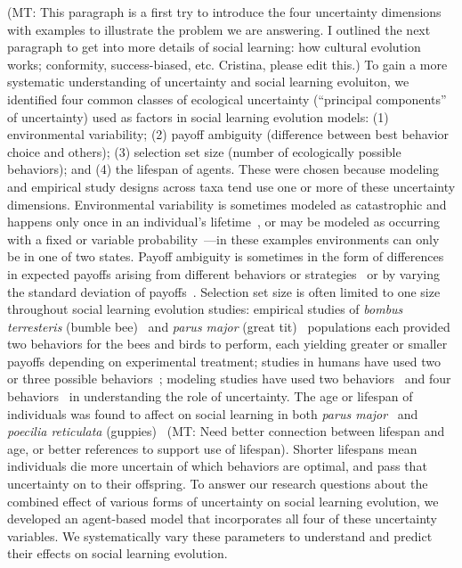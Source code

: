 \documentclass[letterpaper,11.5pt]{scrartcl}
\newcommand{\mt}[1]{{\textcolor{myorange} {({\tiny MT:} #1)}}}
\begin{document}
\mt{This paragraph is a first try to introduce the four uncertainty dimensions
with examples to illustrate the problem we are answering.
I outlined the next paragraph to get into more details of social learning:
how cultural evolution works; conformity, success-biased, etc. Cristina, please
edit this.} 
To gain a more systematic understanding of uncertainty and social learning
evoluiton, we identified four common classes of ecological
uncertainty (``principal components'' of uncertainty) used as factors
in social learning evolution models: (1) environmental variability; (2) payoff
ambiguity (difference between best behavior choice and others); (3) 
selection set size (number of ecologically possible behaviors); and 
(4) the lifespan of agents. These were chosen because modeling and empirical 
study designs across taxa tend use one or more of these uncertainty dimensions.
Environmental variability is sometimes modeled as catastrophic and 
happens only once in an individual's lifetime~\cite{Rogers1988}, or may be
modeled as occurring with a fixed or variable
probability~\cite{Feldman1996,McElreath2005}---in these examples environments
can only be in one of two states. Payoff ambiguity is sometimes in the form
of differences in expected payoffs arising from different
behaviors or strategies~\cite{Enquist2007,Rendell2010}
or by varying the standard deviation of payoffs~\cite{McElreath2005}. 
Selection set size is often limited to one size throughout social learning
evolution studies: empirical studies of \emph{bombus terresteris} (bumble
bee)~\cite{Baracchi2018} and \emph{parus major} (great tit)~\cite{Aplin2017}
populations each provided two behaviors for
the bees and birds to perform, each yielding greater or smaller
payoffs depending on experimental treatment; studies in humans have used two
or three possible behaviors~\cite{McElreath2005,Toyokawa2019}; 
modeling studies have used two 
behaviors~\cite{Feldman1996,Rendell2010} and four behaviors~\cite{Enquist2007} 
in understanding the role of uncertainty. The age or lifespan of individuals was
found to affect on social learning in both \emph{parus
major}~\cite{Aplin2017} and \emph{poecilia reticulata} 
(guppies)~\cite{Leris2016} \mt{Need better connection between lifespan and 
age, or better references to support use of lifespan}.
Shorter lifespans mean individuals
die more uncertain of which behaviors are optimal, and pass that uncertainty on
to their offspring. To answer our research questions about the combined effect
of various forms of uncertainty on social learning evolution, we developed an
agent-based model that incorporates all four of
these uncertainty variables. We systematically vary these parameters
to understand and predict their effects on social learning evolution.
\end{document}
